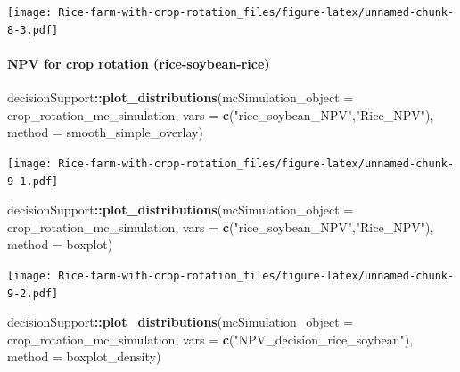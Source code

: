 \documentclass[
]{article}
\newenvironment{Shaded}{\begin{snugshade}}{\end{snugshade}}
\newcommand{\AttributeTok}[1]{\textcolor[rgb]{0.13,0.29,0.53}{#1}}
\newcommand{\FunctionTok}[1]{\textcolor[rgb]{0.13,0.29,0.53}{\textbf{#1}}}
\newcommand{\NormalTok}[1]{#1}
\newcommand{\SpecialCharTok}[1]{\textcolor[rgb]{0.81,0.36,0.00}{\textbf{#1}}}
\newcommand{\StringTok}[1]{\textcolor[rgb]{0.31,0.60,0.02}{#1}}
\begin{document}
\texttt{[image: Rice-farm-with-crop-rotation\_files/figure-latex/unnamed-chunk-8-3.pdf]}

\hypertarget{npv-for-crop-rotation-rice-soybean-rice}{%
\paragraph{NPV for crop rotation
(rice-soybean-rice)}\label{npv-for-crop-rotation-rice-soybean-rice}}

\begin{Shaded}
\begin{Highlighting}[]
\NormalTok{decisionSupport}\SpecialCharTok{::}\FunctionTok{plot\_distributions}\NormalTok{(}\AttributeTok{mcSimulation\_object =}\NormalTok{ crop\_rotation\_mc\_simulation, }
                                    \AttributeTok{vars =} \FunctionTok{c}\NormalTok{(}\StringTok{"rice\_soybean\_NPV"}\NormalTok{,}\StringTok{"Rice\_NPV"}\NormalTok{),}
                                    \AttributeTok{method =} \StringTok{\textquotesingle{}smooth\_simple\_overlay\textquotesingle{}}\NormalTok{)}
\end{Highlighting}
\end{Shaded}

\texttt{[image: Rice-farm-with-crop-rotation\_files/figure-latex/unnamed-chunk-9-1.pdf]}

\begin{Shaded}
\begin{Highlighting}[]
\NormalTok{decisionSupport}\SpecialCharTok{::}\FunctionTok{plot\_distributions}\NormalTok{(}\AttributeTok{mcSimulation\_object =}\NormalTok{ crop\_rotation\_mc\_simulation, }
                                    \AttributeTok{vars =} \FunctionTok{c}\NormalTok{(}\StringTok{"rice\_soybean\_NPV"}\NormalTok{,}\StringTok{"Rice\_NPV"}\NormalTok{),}
                                    \AttributeTok{method =} \StringTok{\textquotesingle{}boxplot\textquotesingle{}}\NormalTok{)}
\end{Highlighting}
\end{Shaded}

\texttt{[image: Rice-farm-with-crop-rotation\_files/figure-latex/unnamed-chunk-9-2.pdf]}

\begin{Shaded}
\begin{Highlighting}[]
\NormalTok{decisionSupport}\SpecialCharTok{::}\FunctionTok{plot\_distributions}\NormalTok{(}\AttributeTok{mcSimulation\_object =}\NormalTok{ crop\_rotation\_mc\_simulation, }
                                    \AttributeTok{vars =} \FunctionTok{c}\NormalTok{(}\StringTok{"NPV\_decision\_rice\_soybean"}\NormalTok{),}
                                    \AttributeTok{method =} \StringTok{\textquotesingle{}boxplot\_density\textquotesingle{}}\NormalTok{)}
\end{Highlighting}
\end{Shaded}
\end{document}
